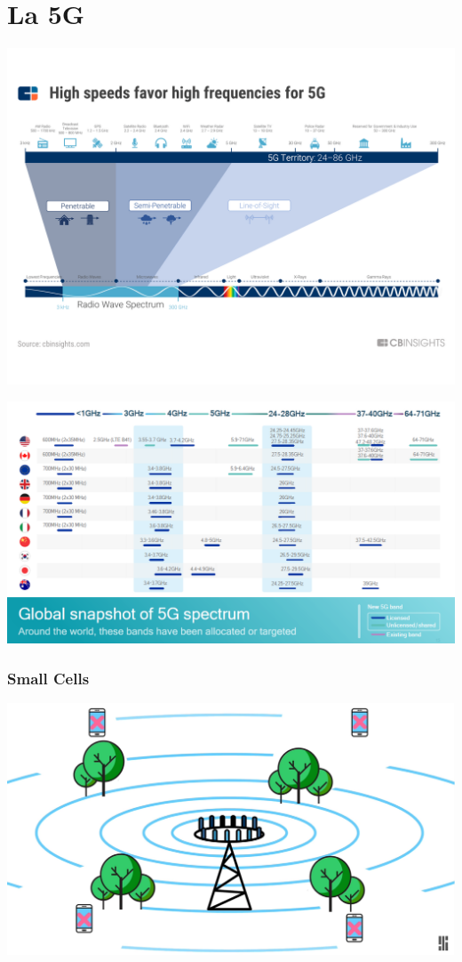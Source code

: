 \documentclass{beamer}
\begin{document}
    \section{La 5G}
    \begin{frame}
        \includegraphics[width=\linewidth]{img/5G-Spectrum.png}
    \end{frame}

    \begin{frame}
        \includegraphics[width=\linewidth]{img/5Gbands.PNG}
    \end{frame}

    \begin{frame}
        \frametitle{Small Cells}
        \includegraphics[width=\linewidth]{img/SmallCell1.png}
    \end{frame}
\end{document}
